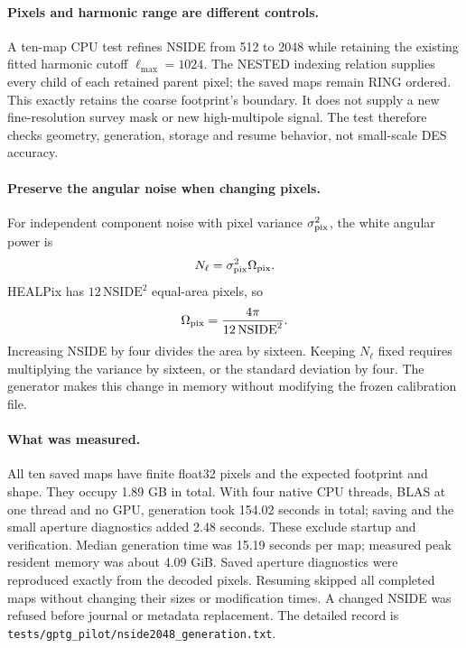\documentclass[11pt]{article}
\begin{document}
\paragraph{Pixels and harmonic range are different controls.}
A ten-map CPU test refines NSIDE from 512 to 2048 while retaining the
existing fitted harmonic cutoff $\ell_{\max}=1024$. The NESTED indexing
relation supplies every child of each retained parent pixel; the saved
maps remain RING ordered. This exactly retains the coarse footprint's
boundary. It does not supply a new fine-resolution survey mask or new
high-multipole signal. The test therefore checks geometry, generation,
storage and resume behavior, not small-scale DES accuracy.

\paragraph{Preserve the angular noise when changing pixels.}
For independent component noise with pixel variance $\sigma_{\rm pix}^2$,
the white angular power is
\begin{equation}
 N_\ell=\sigma_{\rm pix}^2\Omega_{\rm pix}.
\end{equation}
HEALPix has $12\,\mathrm{NSIDE}^2$ equal-area pixels, so
\begin{equation}
 \Omega_{\rm pix}=\frac{4\pi}{12\,\mathrm{NSIDE}^2}.
\end{equation}
Increasing NSIDE by four divides the area by sixteen. Keeping $N_\ell$
fixed requires multiplying the variance by sixteen, or the standard
deviation by four. The generator makes this change in memory without
modifying the frozen calibration file.

\paragraph{What was measured.}
All ten saved maps have finite float32 pixels and the expected footprint
and shape. They occupy 1.89 GB in total. With four native CPU threads,
BLAS at one thread and no GPU, generation took 154.02 seconds in total;
saving and the small aperture diagnostics added 2.48 seconds. These
exclude startup and verification. Median generation time was 15.19
seconds per map; measured peak resident memory was about 4.09 GiB.
Saved aperture diagnostics were reproduced exactly from the decoded
pixels. Resuming skipped all completed maps without changing their
sizes or modification times. A changed NSIDE was refused before journal
or metadata replacement. The detailed record is
\texttt{tests/gptg\_pilot/nside2048\_generation.txt}.
\end{document}

